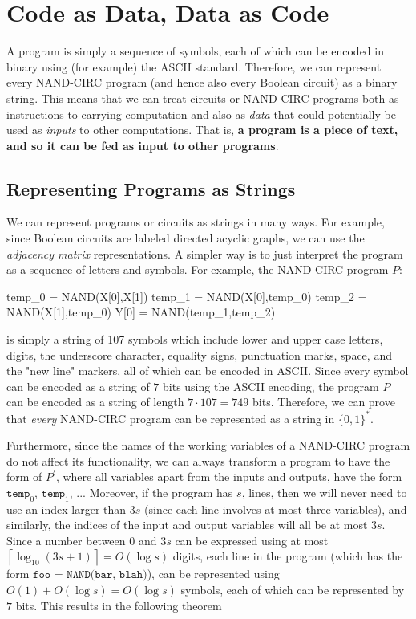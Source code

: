 \documentclass[a4paper, 12pt]{report}
\theoremstyle{remark}
\theoremstyle{definition}
\begin{document}
\section{Code as Data, Data as Code}
A program is simply a sequence of symbols, each of which can be encoded in binary using (for example) the ASCII standard. Therefore, we can represent every NAND-CIRC program (and hence also every Boolean circuit) as a binary string. This means that we can treat circuits or NAND-CIRC programs both as instructions to carrying computation and also as \textit{data} that could potentially be used as \textit{inputs} to other computations. That is, \textbf{a program is a piece of text, and so it can be fed as input to other programs}. 

\subsection{Representing Programs as Strings}
We can represent programs or circuits as strings in many ways. For example, since Boolean circuits are labeled directed acyclic graphs, we can use the \textit{adjacency matrix} representations. A simpler way is to just interpret the program as a sequence of letters and symbols. For example, the NAND-CIRC program $P$: 
\begin{python}
temp_0 = NAND(X[0],X[1])
temp_1 = NAND(X[0],temp_0)
temp_2 = NAND(X[1],temp_0)
Y[0] = NAND(temp_1,temp_2)
\end{python}
is simply a string of 107 symbols which include lower and upper case letters, digits, the underscore character, equality signs, punctuation marks, space, and the "new line" markers, all of which can be encoded in ASCII. Since every symbol can be encoded as a string of $7$ bits using the ASCII encoding, the program $P$ can be encoded as a string of length $7 \cdot 107 = 749$ bits. Therefore, we can prove that \textit{every} NAND-CIRC program can be represented as a string in $\{0,1\}^*$. 

Furthermore, since the names of the working variables of a NAND-CIRC program do not affect its functionality, we can always transform a program to have the form of $P^\prime$, where all variables apart from the inputs and outputs, have the form $\texttt{temp}_0$, $\texttt{temp}_1$, ... Moreover, if the program has $s$, lines, then we will never need to use an index larger than $3s$ (since each line involves at most three variables), and similarly, the indices of the input and output variables will all be at most $3s$. Since a number between $0$ and $3s$ can be expressed using at most $\left\lceil{\log_{10} (3s+1)} \right\rceil = O(\log s)$ digits, each line in the program (which has the form $\texttt{foo = NAND(bar, blah)}$), can be represented using $O(1) + O(\log s) = O(\log s)$ symbols, each of which can be represented by $7$ bits. This results in the following theorem 
\end{document}
